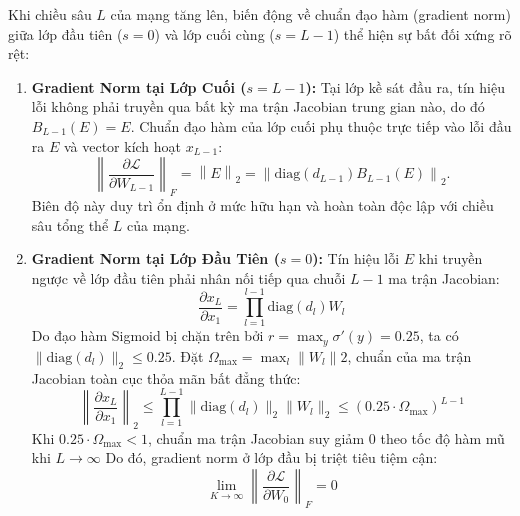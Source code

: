 \documentclass[12pt]{article}
\begin{document}
Khi chiều sâu $L$ của mạng tăng lên, biến động về chuẩn đạo hàm (gradient norm) giữa lớp đầu tiên ($ s= 0$) và lớp cuối cùng ($s = L - 1$) thể hiện sự bất đối xứng rõ rệt:

\begin{enumerate}
    \item \textbf{Gradient Norm tại Lớp Cuối ($s = L -1$):} Tại lớp kề sát đầu ra, tín hiệu lỗi không phải truyền qua bất kỳ ma trận Jacobian trung gian nào, do đó $B_{L-1}(E) = E$. Chuẩn đạo hàm của lớp cuối phụ thuộc trực tiếp vào lỗi đầu ra $E$ và vector kích hoạt $x_{L-1}$:
    \begin{equation}
        \left\| \frac{\partial \mathcal{L}}{\partial W_{L-1}} \right\|_F = \left\| E \right\|_2 = \left\| \text{diag}(d_{L-1}) B_{L-1}(E) \right\|_2.
    \end{equation}
    Biên độ này duy trì ổn định ở mức hữu hạn và hoàn toàn độc lập với chiều sâu tổng thể $L$ của mạng.
    \item \textbf{Gradient Norm tại Lớp Đầu Tiên ($s = 0$):} Tín hiệu lỗi $E$ khi truyền ngược về lớp đầu tiên phải nhân nối tiếp qua chuỗi $L-1$ ma trận Jacobian:
    \begin{equation}
        \frac{\partial x_L}{\partial x_1} = \prod_{l = 1}^{l - 1} \text{diag}(d_l) W_l
    \end{equation}
    Do đạo hàm Sigmoid bị chặn trên bởi $r = \max_y \sigma'(y) = 0.25$, ta có $\|\text{diag}(d_l)\|_2 \le 0.25$. Đặt $\Omega_{\max} = \max_l \|W_l\|2$, chuẩn của ma trận Jacobian toàn cục thỏa mãn bất đẳng thức:
    \begin{equation}
        \left\| \frac{\partial x_L}{\partial x_1} \right\|_2 \le \prod_{l=1}^{L-1} \|\text{diag}(d_l)\|_2 \|W_l\|_2 \le (0.25 \cdot \Omega_{\max})^{L-1}
    \end{equation}
    Khi $0.25 \cdot \Omega_{\max} < 1$, chuẩn ma trận Jacobian suy giảm $0$ theo tốc độ hàm mũ khi $L \to \infty$ Do đó, gradient norm ở lớp đầu bị triệt tiêu tiệm cận:
    \begin{equation}
        \lim_{K \to \infty} \left\| \frac{\partial \mathcal{L}}{\partial W_0} \right\|_F = 0
    \end{equation}


\end{enumerate}
\end{document}
